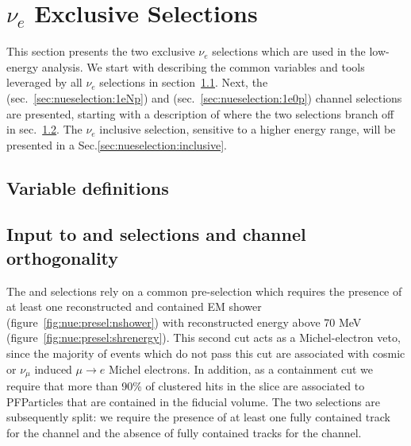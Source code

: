 \section{$\nu_e$ Exclusive Selections}
\label{sec:nueselection}
\par This section presents the two exclusive $\nu_e$ selections which are used in the low-energy analysis. We start with describing the common variables and tools leveraged by all $\nu_e$ selections in section~\ref{sec:nueselection:variables}. Next, the \npsel (sec.~\ref{sec:nueselection:1eNp}) and \zpsel (sec.~\ref{sec:nueselection:1e0p}) channel selections are presented, starting with a description of where the two selections branch off in sec.~\ref{sec:nueselection:inputs}. The $\nu_e$ inclusive selection, sensitive to a higher energy range, will be presented in a Sec.\ref{sec:nueselection:inclusive}.

\subsection{Variable definitions}
\label{sec:nueselection:variables}

\clearpage

\subsection{Input to \npsel and \zpsel selections and channel orthogonality }
\label{sec:nueselection:inputs}

The \npsel and \zpsel selections rely on a common pre-selection which requires the presence of at least one reconstructed and contained EM shower (figure~\ref{fig:nue:presel:nshower}) with reconstructed energy above 70 MeV (figure~\ref{fig:nue:presel:shrenergy}). This second cut acts as a Michel-electron veto, since the majority of events which do not pass this cut are associated with cosmic or $\nu_{\mu}$ induced $\mu \rightarrow e$ Michel electrons. 
In addition, as a containment cut we require that more than 90\% of clustered hits in the slice are associated to PFParticles that are  contained  in the fiducial volume.
The two selections are subsequently split: we require the presence of at least one fully contained track for the \npsel channel and the absence of fully contained tracks for the \zpsel channel.

